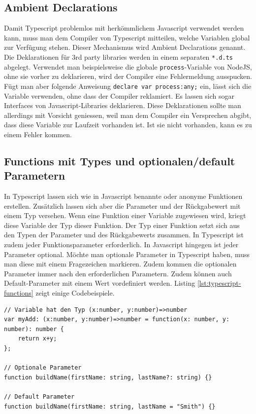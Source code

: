 \subsection{Ambient Declarations}

Damit Typescript problemlos mit herkömmlichem Javascript verwendet werden kann, muss man dem Compiler von Typescript mitteilen, welche Variablen global zur Verfügung stehen. Dieser Mechanismus wird Ambient Declarations genannt. Die Deklarationen für 3rd party libraries werden in einem separaten \lstinline|*.d.ts| abgelegt. Verwendet man beispielsweise die globale \lstinline|process|-Variable von NodeJS, ohne sie vorher zu deklarieren, wird der Compiler eine Fehlermeldung ausspucken. Fügt man aber folgende Anweisung \lstinline|declare var process:any;| ein, lässt sich die Variable verwenden, ohne dass der Compiler reklamiert. Es lassen sich sogar Interfaces von Javascript-Libraries deklarieren. Diese Deklarationen sollte man allerdings mit Vorsicht geniessen, weil man dem Compiler ein Versprechen abgibt, dass diese Variable zur Laufzeit vorhanden ist. Ist sie nicht vorhanden, kann es zu einem Fehler kommen.

\subsection{Functions mit Types und optionalen/default Parametern}

In Typescript lassen sich wie in Javascript benannte oder anonyme Funktionen erstellen. Zusätzlich lassen sich aber die Parameter und der Rückgabewert mit einem Typ versehen. Wenn eine Funktion einer Variable zugewiesen wird, kriegt diese Variable der Typ dieser Funktion. Der Typ einer Funktion setzt sich aus den Typen der Parameter und des Rückgabewerts zusammen. In Typescript ist zudem jeder Funktionsparameter erforderlich. In Javascript hingegen ist jeder Parameter optional. Möchte man optionale Parameter in Typescript haben, muss man diese mit einem Fragezeichen markieren. Zudem kommen die optionalen Parameter immer nach den erforderlichen Parametern. Zudem können auch Default-Parameter mit einem Wert vordefiniert werden. Listing \ref{lst:typescript-functions} zeigt einige Codebeispiele.

\begin{lstlisting}[label=lst:typescript-functions,caption=Functions]
// Variable hat den Typ (x:number, y:number)=>number
var myAdd: (x:number, y:number)=>number = function(x: number, y: number): number { 
	return x+y; 
};

// Optionale Parameter
function buildName(firstName: string, lastName?: string) {}

// Default Parameter
function buildName(firstName: string, lastName = "Smith") {}
\end{lstlisting}

